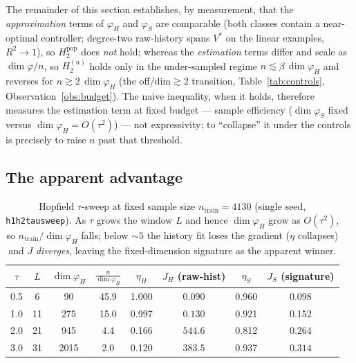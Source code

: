 \documentclass[11pt]{article}
\renewcommand{\_}{\discretionary{\textunderscore}{}{\textunderscore}}
\theoremstyle{plain}
\theoremstyle{definition}
\begin{document}
The remainder of this section establishes, by measurement, that the \emph{approximation} terms of
$\varphi_H$ and $\varphi_S$ are comparable (both classes contain a near-optimal controller; degree-two
raw-history spans $V^{\ast}$ on the linear examples, $R^{2}\to1$), so $H_2^{\mathrm{pop}}$ does
\emph{not} hold; whereas the \emph{estimation} terms differ and scale as $\dim\varphi/n$, so
$H_2^{(n)}$ holds only in the under-sampled regime $n\lesssim \beta\,\dim\varphi_H$ and reverses for
$n\gtrsim2\,\dim\varphi_H$ (the off/dim${}\gtrsim2$ transition, Table~\ref{tab:controls},
Observation~\ref{obs:budget}). The naive inequality, when it holds, therefore measures the
estimation term at fixed budget --- sample efficiency ($\dim\varphi_S$ fixed versus
$\dim\varphi_H=O(\tau^{2})$) --- not expressivity; to ``collapse'' it under the controls is precisely
to raise $n$ past that threshold.

\subsection{The apparent advantage}

\begin{table}[ht]\centering\small
\caption{Hopfield $\tau$-sweep at fixed sample size $n_{\text{train}}=4130$ (single seed,
\texttt{h1h2\_tau\_sweep}). As $\tau$ grows the window $L$ and hence $\dim\varphi_H$ grow as
$O(\tau^{2})$, so $n_{\text{train}}/\dim\varphi_H$ falls; below ${\sim}5$ the history fit loses the
gradient ($\eta$ collapses) and $J$ \emph{diverges}, leaving the fixed-dimension signature as
the apparent winner.}\label{tab:tausweep}
\setlength{\tabcolsep}{5pt}
\begin{tabular}{cccc cc cc}
\toprule
$\tau$ & $L$ & $\dim\varphi_H$ & $\tfrac{n}{\dim\varphi_H}$
 & $\eta_{H}$ & $J_{H}$ (raw-hist) & $\eta_{S}$ & $J_{S}$ (signature)\\
\midrule
0.5 & 6  & 90   & 45.9 & 1.000 & $\mathbf{0.090}$ & 0.960 & 0.098\\
1.0 & 11 & 275  & 15.0 & 0.997 & $\mathbf{0.130}$ & 0.921 & 0.152\\
2.0 & 21 & 945  & 4.4  & 0.166 & $544.6$          & 0.812 & $\mathbf{0.264}$\\
3.0 & 31 & 2015 & 2.0  & 0.120 & $383.5$          & 0.937 & $\mathbf{0.314}$\\
\bottomrule
\end{tabular}
\end{table}
\end{document}
